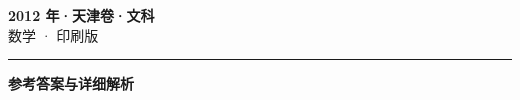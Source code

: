\documentclass[zihao=5, a4paper]{ctexart}
\begin{document}
\begin{center}
  {\Large\bfseries 2012 年·天津卷·文科}\\[4pt]
  {\large 数学 · 印刷版}
\end{center}
\medskip
{}

\par\bigskip\hrule\bigskip
{}
\begin{center}{\large\bfseries 参考答案与详细解析}\end{center}
\smallskip

\end{document}
